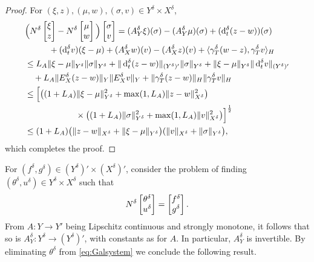 \documentclass{amsart}
\numberwithin{equation}{section}
\newcommand{\NN}{N}
\newcommand{\1}{\mathbb 1}
\newcommand*\diff{\mathop{}\!\mathrm{d}}
\newcommand{\be}{\begin{equation}}
\newcommand{\ee}{\end{equation}}
\begin{document}
\begin{proof} For $(\xi,z), (\mu,w), (\sigma,v) \in Y^\delta \times X^\delta$,
\begin{align*}
&\Big(\NN^\delta
\left[\begin{array}{@{}c@{}} \xi \\ z \end{array}\right]
-
\NN^\delta
\left[\begin{array}{@{}c@{}} \mu \\ w\end{array}\right]
\Big)
\left[\begin{array}{@{}c@{}} \sigma \\ v \end{array}\right]
=
(A_Y^\delta \xi)(\sigma)-(A_Y^\delta \mu)(\sigma)+(\diff_t^\delta(z-w))(\sigma)\\
&\hspace*{1cm}+(\diff_t^\delta v)(\xi-\mu)+(A_X^\delta w)(v)-(A_X^\delta z)(v)+\langle \gamma_T^\delta (w-z),\gamma_T^\delta v\rangle_H\\
&\leq L_A\|\xi-\mu\|_{Y^\delta} \|\sigma\|_{Y^\delta}+\|\diff_t^\delta(z-w)\|_{(Y^\delta)'}\|\sigma\|_{Y^\delta}+\|\xi-\mu\|_{Y^\delta}\|\diff_t^\delta v\|_{(Y^\delta)'}\\
&\hspace{1em} + L_A\|E_X^\delta(z-w)\|_Y \|E_X^\delta v\|_Y+\|\gamma_T^\delta (z-w)\|_H \|\gamma_T^\delta v\|_H\\
& \leq
\Big[ \big((1+L_A) \|\xi-\mu\|_{Y^\delta}^2+\max(1,L_A)\|z-w\|_{X^\delta}^2\big)\\
&\hspace{6em} \times \big((1+L_A) \|\sigma\|_{Y^\delta}^2+\max(1,L_A)\|v\|_{X^\delta}^2\big)\Big]^\frac12\\
& \leq (1+L_A) \big(\|z-w\|_{X^\delta}+\|\xi-\mu\|_{Y^\delta}\big)(\|v\|_{X^\delta}+\|\sigma\|_{Y^\delta}\big),
\end{align*}
which completes the proof.
 \end{proof}
 
 For $(f^\delta,g^\delta) \in (Y^\delta)' \times (X^\delta)'$,  consider the problem of finding $(\theta^\delta,u^\delta) \in Y^\delta \times X^\delta$ such that
\be \label{eq:Galsystem}
\NN^\delta \left[\begin{array}{@{}c@{}} \theta^\delta \\ u^\delta \end{array}\right]=\left[\begin{array}{@{}c@{}} f^\delta \\ g^\delta \end{array}\right].
\ee
From $A\colon Y \rightarrow Y'$ being Lipschitz continuous and strongly monotone, it follows that so is $A_Y^\delta\colon Y^\delta \rightarrow (Y^\delta)'$, with constants as for $A$. In particular, $A_Y^\delta$ is invertible. 
By eliminating $\theta^\delta$ from \eqref{eq:Galsystem} we conclude the following result.
\end{document}
